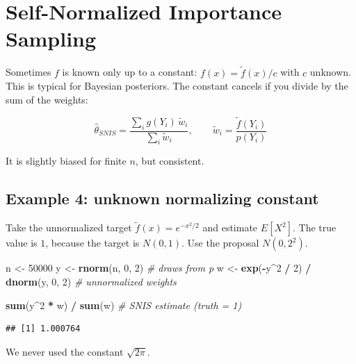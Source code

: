 \documentclass[
]{article}
\newenvironment{Shaded}{\begin{snugshade}}{\end{snugshade}}
\newcommand{\CommentTok}[1]{\textcolor[rgb]{0.56,0.35,0.01}{\textit{#1}}}
\newcommand{\DecValTok}[1]{\textcolor[rgb]{0.00,0.00,0.81}{#1}}
\newcommand{\FunctionTok}[1]{\textcolor[rgb]{0.13,0.29,0.53}{\textbf{#1}}}
\newcommand{\NormalTok}[1]{#1}
\newcommand{\OtherTok}[1]{\textcolor[rgb]{0.56,0.35,0.01}{#1}}
\newcommand{\SpecialCharTok}[1]{\textcolor[rgb]{0.81,0.36,0.00}{\textbf{#1}}}
\begin{document}
\section{Self-Normalized Importance
Sampling}\label{self-normalized-importance-sampling}

Sometimes \(f\) is known only up to a constant: \(f(x) = \tilde f(x)/c\)
with \(c\) unknown. This is typical for Bayesian posteriors. The
constant cancels if you divide by the sum of the weights:

\[
\hat\theta_{SNIS} = \frac{\sum_i g(Y_i)\,\tilde w_i}{\sum_i \tilde w_i},
\qquad \tilde w_i = \frac{\tilde f(Y_i)}{p(Y_i)}
\]

It is slightly biased for finite \(n\), but consistent.

\subsection{Example 4: unknown normalizing
constant}\label{example-4-unknown-normalizing-constant}

Take the unnormalized target \(\tilde f(x)=e^{-x^2/2}\) and estimate
\(E[X^2]\). The true value is \(1\), because the target is \(N(0,1)\).
Use the proposal \(N(0, 2^2)\).

\begin{Shaded}
\begin{Highlighting}[]
\NormalTok{n }\OtherTok{\textless{}{-}} \DecValTok{50000}
\NormalTok{y }\OtherTok{\textless{}{-}} \FunctionTok{rnorm}\NormalTok{(n, }\DecValTok{0}\NormalTok{, }\DecValTok{2}\NormalTok{)                       }\CommentTok{\# draws from p}
\NormalTok{w }\OtherTok{\textless{}{-}} \FunctionTok{exp}\NormalTok{(}\SpecialCharTok{{-}}\NormalTok{y}\SpecialCharTok{\^{}}\DecValTok{2} \SpecialCharTok{/} \DecValTok{2}\NormalTok{) }\SpecialCharTok{/} \FunctionTok{dnorm}\NormalTok{(y, }\DecValTok{0}\NormalTok{, }\DecValTok{2}\NormalTok{)       }\CommentTok{\# unnormalized weights}

\FunctionTok{sum}\NormalTok{(y}\SpecialCharTok{\^{}}\DecValTok{2} \SpecialCharTok{*}\NormalTok{ w) }\SpecialCharTok{/} \FunctionTok{sum}\NormalTok{(w)                     }\CommentTok{\# SNIS estimate (truth = 1)}
\end{Highlighting}
\end{Shaded}

\begin{verbatim}
## [1] 1.000764
\end{verbatim}

We never used the constant \(\sqrt{2\pi}\).
\end{document}
